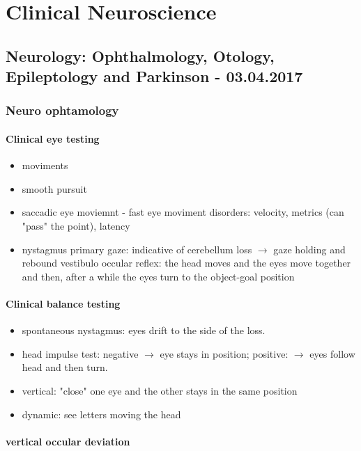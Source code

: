 \documentclass[12pt,article,oneside,a4paper]{memoir}
\begin{document}
\section{Clinical Neuroscience}

\subsection{Neurology: Ophthalmology, Otology, Epileptology and Parkinson - 03.04.2017}
\subsubsection{Neuro ophtamology}
\paragraph{Clinical eye testing}  
\begin{itemize}
\item moviments
\item smooth pursuit
\item saccadic eye moviemnt - fast eye moviment
\subitem disorders: velocity, metrics (can "pass" the point), latency
\item nystagmus
\subitem primary gaze: indicative of cerebellum loss $\rightarrow$ gaze holding and rebound
\subitem vestibulo occular reflex: the head moves and the eyes move together and then, after a while the eyes turn to the object-goal position
\end{itemize}

\paragraph{Clinical balance testing}
\begin{itemize}
\item spontaneous nystagmus: eyes drift to the side of the loss.
\item head impulse test: negative $\rightarrow$ eye stays in position; positive: $\rightarrow$ eyes follow head and then turn.
\item vertical: "close" one eye and the other stays in the same position
\item dynamic: see letters moving the head
\end{itemize}

\paragraph{vertical occular deviation}
\end{document}
